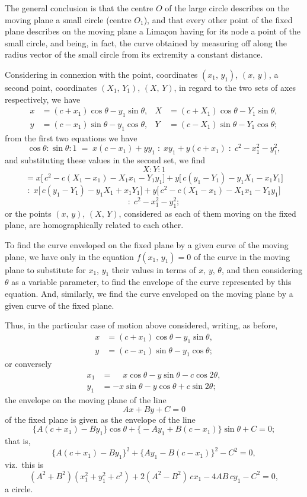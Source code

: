 \documentclass[11pt]{article}
\begin{document}
The general conclusion is that the centre $O$ of the large circle describes on the
moving plane a small circle (centre $O_1$), and that every other point of the fixed plane
describes on the moving plane a Lima\c{c}on having for its node a point of the small
circle, and being, in fact, the curve obtained by measuring off along the radius vector
of the small circle from its extremity a constant distance.

\bigskip

Considering in connexion with the point, coordinates $(x_1,\,y_1)$, $(x,\,y)$, a second
point, coordinates $(X_1,\,Y_1)$, $(X,\,Y)$, in regard to the two sets of axes respectively,
we have
\begin{align*}
x &= (c + x_1)\cos\theta - y_1 \sin\theta,  & X &= (c + X_1)\cos\theta - Y_1 \sin\theta,\\
y &= (c - x_1)\sin\theta - y_1 \cos\theta,  & Y &= (c - X_1)\sin\theta - Y_1 \cos\theta;
\end{align*}
from the first two equations we have
\[
\cos\theta : \sin\theta : 1 \;=\; x(c-x_1) + yy_1 \;:\; xy_1 + y(c+x_1) \;:\; c^2 - x_1^2 - y_1^2,
\]
and substituting these values in the second set, we find
\[
X : Y : 1
\]
\[
= x\bigl[\,c^2 - c(X_1 - x_1) - X_1 x_1 - Y_1 y_1\bigr] + y\bigl[\,c(y_1 - Y_1) - y_1 X_1 - x_1 Y_1\bigr]
\]
\[
:\; x\bigl[\,c(y_1 - Y_1) - y_1 X_1 + x_1 Y_1\bigr] + y\bigl[\,c^2 - c(X_1 - x_1) - X_1 x_1 - Y_1 y_1\bigr]
\]
\[
:\; c^2 - x_1^2 - y_1^2;
\]
or the points $(x,\,y)$, $(X,\,Y)$, considered as each of them moving on the fixed plane,
are homographically related to each other.

\bigskip

To find the curve enveloped on the fixed plane by a given curve of the moving
plane, we have only in the equation $f(x_1,\,y_1) = 0$ of the curve in the moving plane
to substitute for $x_1$, $y_1$ their values in terms of $x,\,y,\,\theta$, and then considering $\theta$ as
a variable parameter, to find the envelope of the curve represented by this equation.
And, similarly, we find the curve enveloped on the moving plane by a given curve
of the fixed plane.

Thus, in the particular case of motion above considered, writing, as before,
\begin{align*}
x &= (c + x_1)\cos\theta - y_1 \sin\theta,\\
y &= (c - x_1)\sin\theta - y_1 \cos\theta;
\end{align*}
or conversely
\begin{align*}
x_1 &= \phantom{-}x\cos\theta - y\sin\theta - c\cos 2\theta,\\
y_1 &= -x\sin\theta - y\cos\theta + c\sin 2\theta;
\end{align*}
the envelope on the moving plane of the line
\[
   Ax + By + C = 0
\]
of the fixed plane is given as the envelope of the line
\[
   \bigl\{A(c + x_1) - By_1\bigr\}\cos\theta + \bigl\{-Ay_1 + B(c - x_1)\bigr\}\sin\theta + C = 0;
\]
that is,
\[
   \bigl\{A(c + x_1) - By_1\bigr\}^2 + \bigl\{Ay_1 - B(c - x_1)\bigr\}^2 - C^2 = 0,
\]
viz.\ this is
\[
   (A^2 + B^2)(x_1^2 + y_1^2 + c^2) + 2(A^2 - B^2)\,cx_1 - 4AB\,cy_1 - C^2 = 0,
\]
a circle.
\end{document}
